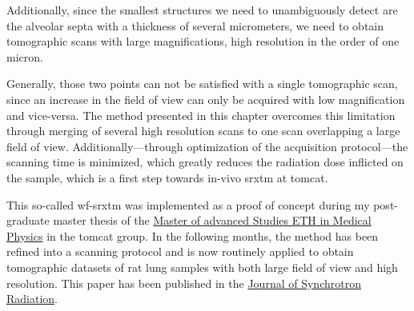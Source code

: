 Additionally, since the smallest structures we need to unambiguously detect are the alveolar septa with a thickness of several micrometers, we need to obtain tomographic scans with large magnifications, \ie high resolution in the order of one micron. 

Generally, those two points can not be satisfied with a single tomographic scan, since an increase in the field of view can only be acquired with low magnification and vice-versa. The method presented in this chapter overcomes this limitation through merging of several high resolution scans to one scan overlapping a large field of view. Additionally---through optimization of the acquisition protocol---the scanning time is minimized, which greatly reduces the radiation dose inflicted on the sample, which is a first step towards in-vivo \ac{srxtm} at \ac{tomcat}.

This so-called \ac{wf-srxtm} was implemented as a proof of concept during my post-graduate master thesis of the \href{http://www.biomed.ee.ethz.ch/nds/}{Master of advanced Studies ETH in Medical Physics} in the \ac{tomcat} group. In the following months, the method has been refined into a scanning protocol and is now routinely applied to obtain tomographic datasets of rat lung samples with both large field of view and high resolution. This paper has been published in the \href{http://journals.iucr.org/s/}{Journal of Synchrotron Radiation}.

